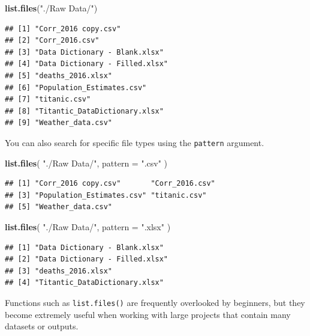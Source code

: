 \documentclass[
  11pt,
  oneside]{book}
\newenvironment{Shaded}{\begin{snugshade}}{\end{snugshade}}
\newcommand{\AttributeTok}[1]{\textcolor[rgb]{0.13,0.29,0.53}{#1}}
\newcommand{\FunctionTok}[1]{\textcolor[rgb]{0.13,0.29,0.53}{\textbf{#1}}}
\newcommand{\NormalTok}[1]{#1}
\newcommand{\StringTok}[1]{\textcolor[rgb]{0.31,0.60,0.02}{#1}}
\begin{document}
\begin{Shaded}
\begin{Highlighting}[]
\FunctionTok{list.files}\NormalTok{(}\StringTok{"./Raw Data/"}\NormalTok{)}
\end{Highlighting}
\end{Shaded}

\begin{verbatim}
## [1] "Corr_2016 copy.csv"           
## [2] "Corr_2016.csv"                
## [3] "Data Dictionary - Blank.xlsx" 
## [4] "Data Dictionary - Filled.xlsx"
## [5] "deaths_2016.xlsx"             
## [6] "Population_Estimates.csv"     
## [7] "titanic.csv"                  
## [8] "Titantic_DataDictionary.xlsx" 
## [9] "Weather_data.csv"
\end{verbatim}

You can also search for specific file types using the \texttt{pattern} argument.

\begin{Shaded}
\begin{Highlighting}[]
\FunctionTok{list.files}\NormalTok{(}
  \StringTok{"./Raw Data/"}\NormalTok{,}
  \AttributeTok{pattern =} \StringTok{".csv"}
\NormalTok{)}
\end{Highlighting}
\end{Shaded}

\begin{verbatim}
## [1] "Corr_2016 copy.csv"       "Corr_2016.csv"           
## [3] "Population_Estimates.csv" "titanic.csv"             
## [5] "Weather_data.csv"
\end{verbatim}

\begin{Shaded}
\begin{Highlighting}[]
\FunctionTok{list.files}\NormalTok{(}
  \StringTok{"./Raw Data/"}\NormalTok{,}
  \AttributeTok{pattern =} \StringTok{".xlsx"}
\NormalTok{)}
\end{Highlighting}
\end{Shaded}

\begin{verbatim}
## [1] "Data Dictionary - Blank.xlsx" 
## [2] "Data Dictionary - Filled.xlsx"
## [3] "deaths_2016.xlsx"             
## [4] "Titantic_DataDictionary.xlsx"
\end{verbatim}

Functions such as \texttt{list.files()} are frequently overlooked by beginners, but they become extremely useful when working with large projects that contain many datasets or outputs.
\end{document}
